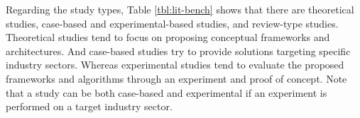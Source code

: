 Regarding the study types, Table \ref{tbl:lit-bench} shows that there are theoretical studies, case-based and experimental-based studies, and review-type studies. Theoretical studies tend to focus on proposing conceptual frameworks and architectures. And case-based studies try to provide solutions targeting specific industry sectors. Whereas experimental studies tend to evaluate the proposed frameworks and algorithms through an experiment and proof of concept. Note that a study can be both case-based and experimental if an experiment is performed on a target industry sector. 



   
    

